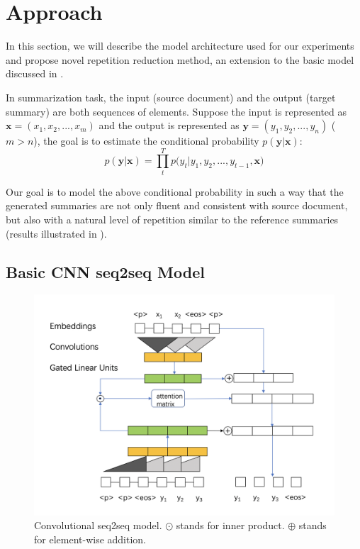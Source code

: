 \section{Approach}
\label{sec:approach}

In this section, we will describe the model architecture used for our experiments
and propose novel repetition reduction method, an extension to the basic model discussed in .

In summarization task, the input (source document) and
the output (target summary) are both sequences of elements.
Suppose the input is represented as
$\textbf{x} = (x_{1},x_{2},...,x_{m})$ and the output is represented as
$\textbf{y} = (y_{1}, y_{2},..., y_{n})$ ($m>n$),
the goal is to estimate the conditional probability
$p(\textbf{y}|\textbf{x})$:
\begin{equation}
p(\textbf{y} | \textbf{x}) \!=\! {\prod^T_{t} {p(y_{t} | y_{1}, y_{2},..., y_{t-1}, \textbf{x}})}
\end{equation}

Our goal is to model the above conditional probability in such a way that the generated summaries are not only fluent and consistent with source document, but also with a natural level of repetition similar to the reference summaries (results illustrated in ). 

\subsection{Basic CNN seq2seq Model}
\label{sec:basic}

\begin{figure}
    \centering
    \includegraphics[width=0.8\linewidth]{basic_model.png}
    \caption{Convolutional seq2seq model. $\odot$ stands for inner product. $\oplus$ stands for element-wise addition.}
    \label{fig:basicModel}
\end{figure}

